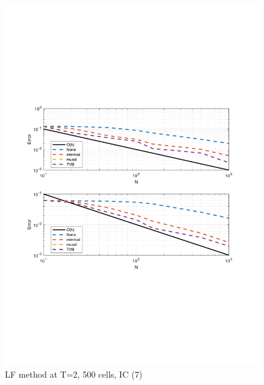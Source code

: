 \documentclass[11pt,a4paper]{article}
\begin{document}
\begin{figure}[!htb]
    \centering
    \includegraphics[width=11cm]{2_2_c_IC_3_LF.pdf}
    \caption{LF method at T=2, 500 cells, IC (7)}
    \label{fig:LF_IC_3_error}
\end{figure}
\end{document}
